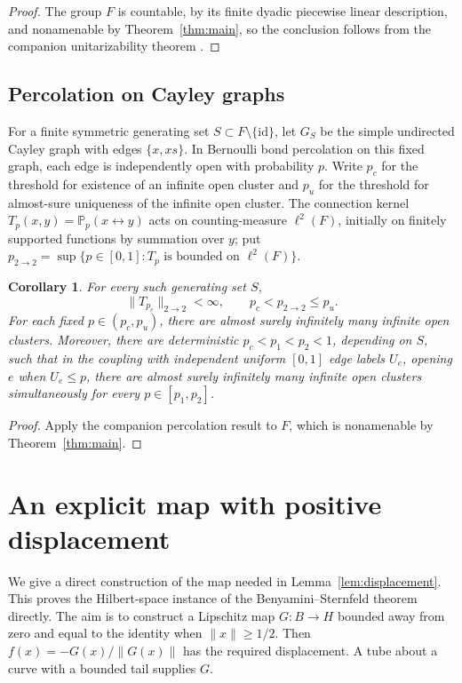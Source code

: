 \documentclass[11pt]{article}
\newcommand{\norm}[1]{\lVert #1\rVert}
\newcommand{\id}{\mathrm{id}}
\newtheorem{corollary}[theorem]{Corollary}
\theoremstyle{definition}
\numberwithin{equation}{section}
\begin{document}
\begin{proof}
The group \(F\) is countable, by its finite dyadic piecewise linear
description, and nonamenable by Theorem~\ref{thm:main}, so the conclusion
follows from the companion unitarizability theorem
\cite[Theorem~1.1]{OpenAIUnitarizability2026}.
\end{proof}

\subsection{Percolation on Cayley graphs}

For a finite symmetric generating set \(S\subset F\setminus\{\id\}\), let
\(G_S\) be the simple undirected Cayley graph with edges \(\{x,xs\}\).
In Bernoulli bond percolation on this fixed graph, each edge is independently
open with probability \(p\). Write \(p_c\) for the threshold for existence
of an infinite open cluster and \(p_u\) for the threshold for almost-sure
uniqueness of the infinite open cluster. The connection kernel
\(T_p(x,y)=\mathbb P_p(x\leftrightarrow y)\) acts on counting-measure
\(\ell^2(F)\), initially on finitely supported functions by summation over
\(y\); put \(p_{2\to2}=\sup\{p\in[0,1]:T_p\text{ is bounded on }\ell^2(F)\}\).

\begin{corollary}\label{cor:percolation}
For every such generating set \(S\),
\[
  \norm{T_{p_c}}_{2\to2}<\infty,\qquad p_c<p_{2\to2}\le p_u.
\]
For each fixed \(p\in(p_c,p_u)\), there are almost surely infinitely many
infinite open clusters. Moreover, there are deterministic
\(p_c<p_1<p_2<1\), depending on \(S\), such that in the coupling with
independent uniform \([0,1]\) edge labels \(U_e\), opening \(e\) when \(U_e\le p\),
there are almost surely infinitely many infinite open clusters
simultaneously for every \(p\in[p_1,p_2]\).
\end{corollary}

\begin{proof}
Apply the companion percolation result
\cite[Corollary~1.2]{OpenAIPercolation2026} to \(F\), which is nonamenable
by Theorem~\ref{thm:main}.
\end{proof}


\appendix
\section{An explicit map with positive displacement}\label{app:auxiliary}

We give a direct construction of the map needed in
Lemma~\ref{lem:displacement}. This proves the Hilbert-space instance of
the Benyamini--Sternfeld theorem~\cite{BenyaminiSternfeld1983} directly.
The aim is to construct a Lipschitz map
$G:B\to H$ bounded away from zero and equal to the identity when
$\norm{x}\ge1/2$. Then $f(x)=-G(x)/\norm{G(x)}$ has the required
displacement. A tube about a curve with a bounded tail supplies $G$.
\end{document}
